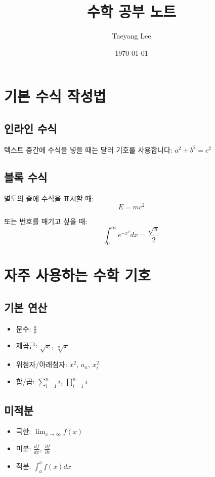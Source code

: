 \documentclass[12pt,a4paper]{article}
\title{수학 공부 노트}
\author{Taeyang Lee}
\date{\today}
\begin{document}
\maketitle
\tableofcontents  %
\newpage

\section{기본 수식 작성법}

\subsection{인라인 수식}
텍스트 중간에 수식을 넣을 때는 달러 기호를 사용합니다: $a^2 + b^2 = c^2$

\subsection{블록 수식}
별도의 줄에 수식을 표시할 때:
\[
    E = mc^2
\]

또는 번호를 매기고 싶을 때:
\begin{equation}
    \int_{0}^{\infty} e^{-x^2} dx = \frac{\sqrt{\pi}}{2}
\end{equation}

\section{자주 사용하는 수학 기호}

\subsection{기본 연산}
\begin{itemize}
    \item 분수: $\frac{a}{b}$
    \item 제곱근: $\sqrt{x}$, $\sqrt[n]{x}$
    \item 위첨자/아래첨자: $x^2$, $a_n$, $x_i^2$
    \item 합/곱: $\sum_{i=1}^{n} i$, $\prod_{i=1}^{n} i$
\end{itemize}

\subsection{미적분}
\begin{itemize}
    \item 극한: $\lim_{x \to \infty} f(x)$
    \item 미분: $\frac{df}{dx}$, $\frac{\partial f}{\partial x}$
    \item 적분: $\int_{a}^{b} f(x) dx$
\end{itemize}
\end{document}
